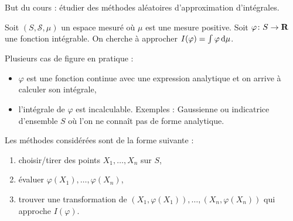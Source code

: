But du cours : étudier des méthodes aléatoires d'approximation d'intégrales.

Soit $(S,\mathcal{S},\mu)$ un espace mesuré où $\mu$ est une mesure positive.
Soit $\varphi \colon S \to \mathbf{R}$ une fonction intégrable.
On cherche à approcher $I(\varphi) = \int \varphi \mathop{}\mathopen{}\mathrm{d} \mu$.

Plusieurs cas de figure en pratique :
\begin{itemize}
	\item[\textbullet] $\varphi$ est une fonction continue avec une expression analytique et on arrive à calculer son intégrale,
	\item[\textbullet] l'intégrale de $\varphi$ est incalculable.
		Exemples : Gaussienne ou indicatrice d'ensemble $S$ où l'on ne connaît pas de forme analytique.
\end{itemize}

Les méthodes considérées sont de la forme suivante :
\begin{enumerate}
	\item choisir/tirer des points $X_1,\ldots,X_n$ sur $S$,
	\item évaluer $\varphi(X_1),\ldots,\varphi(X_n)$,
	\item trouver une transformation de $(X_1, \varphi(X_1)),\ldots,(X_n, \varphi(X_n))$ qui approche $I(\varphi)$.
\end{enumerate}
